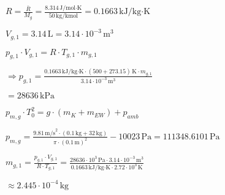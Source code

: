 \( R = \frac{\bar{R}}{M_g} = \frac{8.314 \, \text{J/mol·K}}{50 \, \text{kg/kmol}} = 0.1663 \, \text{kJ/kg·K} \)  

\( V_{g,1} = 3.14 \, \text{L} = 3.14 \cdot 10^{-3} \, \text{m}^3 \)  

\( p_{g,1} \cdot V_{g,1} = R \cdot T_{g,1} \cdot m_{g,1} \)  

\( \Rightarrow p_{g,1} = \frac{0.1663 \, \text{kJ/kg·K} \cdot (500 + 273.15) \, \text{K} \cdot m_{g,1}}{3.14 \cdot 10^{-3} \, \text{m}^3} \)  

\( = 28636 \, \text{kPa} \)  

\( p_{m,g} \cdot T_{0}^2 = g \cdot (m_K + m_{EW}) + p_{amb} \)  

\( p_{m,g} = \frac{9.81 \, \text{m/s}^2 \cdot (0.1 \, \text{kg} + 32 \, \text{kg})}{\pi \cdot (0.1 \, \text{m})^2} - 10023 \, \text{Pa} = 111348.6101 \, \text{Pa} \)  

\( m_{g,1} = \frac{p_{g,1} \cdot V_{g,1}}{R \cdot T_{g,1}} = \frac{28636 \cdot 10^3 \, \text{Pa} \cdot 3.14 \cdot 10^{-3} \, \text{m}^3}{0.1663 \, \text{kJ/kg·K} \cdot 2.72 \cdot 10^3 \, \text{K}} \)  

\( \approx 2.445 \cdot 10^{-4} \, \text{kg} \)